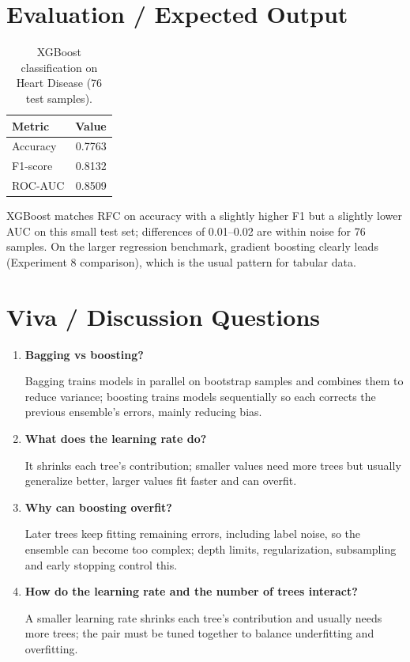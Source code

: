 \section{Evaluation / Expected Output}
\begin{table}[htbp]
  \centering
  \caption{XGBoost classification on Heart Disease (76 test samples).}
  \begin{tabular}{|l|r|}
    \hline
\rowcolor{mlblue!8}    \textbf{Metric} & \textbf{Value} \\
    \hline
    Accuracy & 0.7763 \\
\hline
    F1-score & 0.8132 \\
\hline
    ROC-AUC & 0.8509 \\
    \hline
  \end{tabular}
\end{table}

XGBoost matches RFC on accuracy with a slightly higher F1 but a slightly lower AUC on this
small test set; differences of 0.01--0.02 are within noise for 76 samples. On the larger
regression benchmark, gradient boosting clearly leads (Experiment 8 comparison), which is the
usual pattern for tabular data.

\section{Viva / Discussion Questions}
\begin{enumerate}
  \item \textbf{Bagging vs boosting?}\par\nobreak Bagging trains models in parallel on bootstrap samples and
  combines them to reduce variance; boosting trains models sequentially so each corrects the
  previous ensemble's errors, mainly reducing bias.
  \item \textbf{What does the learning rate do?}\par\nobreak It shrinks each tree's contribution; smaller values
  need more trees but usually generalize better, larger values fit faster and can overfit.
  \item \textbf{Why can boosting overfit?}\par\nobreak Later trees keep fitting remaining errors, including label
  noise, so the ensemble can become too complex; depth limits, regularization, subsampling and
  early stopping control this.
\item \textbf{How do the learning rate and the number of trees interact?}\par\nobreak A smaller learning rate shrinks each tree's contribution and usually needs more trees; the pair must be tuned together to balance underfitting and overfitting.
\end{enumerate}


